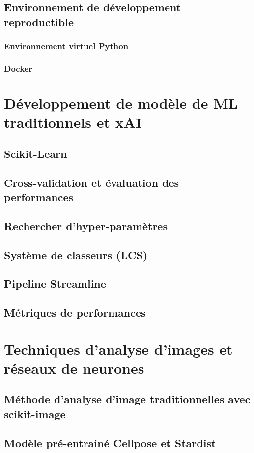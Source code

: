 \subsection{Environnement de développement reproductible}
\subsubsection{Environnement virtuel Python}
\subsubsection{Docker}
\section{Développement de modèle de ML traditionnels et xAI}
\subsection{Scikit-Learn}
\subsection{Cross-validation et évaluation des performances}
\subsection{Rechercher d'hyper-paramètres}
\subsection{Système de classeurs (LCS)}
\subsection{Pipeline Streamline}
\subsection{Métriques de performances}
\section{Techniques d'analyse d'images et réseaux de neurones}
\subsection{Méthode d'analyse d'image traditionnelles avec scikit-image}
\subsection{Modèle pré-entrainé Cellpose et Stardist}
